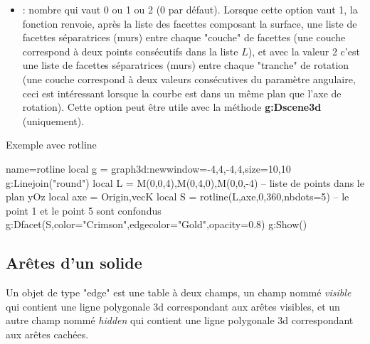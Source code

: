 \begin{itemize}
\begin{itemize}
        \item {} : nombre qui vaut 0 ou 1 ou 2 (0 par défaut). Lorsque cette option vaut 1, la fonction renvoie, après la liste des facettes composant la surface, une liste de facettes séparatrices (murs) entre chaque "couche" de facettes (une couche correspond à deux points consécutifs dans la liste $L$), et avec la valeur 2 c'est une liste de facettes séparatrices (murs) entre chaque "tranche" de rotation (une couche correspond à deux valeurs consécutives du paramètre angulaire, ceci est intéressant lorsque la courbe est dans un même plan que l'axe de rotation). Cette option peut être utile avec la méthode \textbf{g:Dscene3d} (uniquement).
        \end{itemize} 
\begin{demo}{Exemple avec rotline}
\begin{luadraw}{name=rotline}
local g = graph3d:new{window={-4,4,-4,4},size={10,10}}
g:Linejoin("round")
local L = {M(0,0,4),M(0,4,0),M(0,0,-4)} -- liste de points dans le plan yOz
local axe = {Origin,vecK}
local S = rotline(L,axe,0,360,{nbdots=5}) -- le point 1 et le point 5 sont confondus
g:Dfacet(S,{color="Crimson",edgecolor="Gold",opacity=0.8})
g:Show()
\end{luadraw}
\end{demo}      
\end{itemize}   

\subsection{Arêtes d'un solide}

Un objet de type "edge" est une table à deux champs, un champ nommé \emph{visible} qui contient une ligne polygonale 3d correspondant aux arêtes visibles, et un autre champ nommé \emph{hidden} qui contient une ligne polygonale 3d correspondant aux arêtes cachées.

